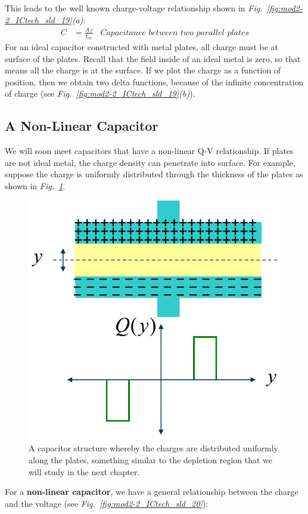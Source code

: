 This leads to the well known charge-voltage relationship shown in \emph{Fig.~\ref{fig:mod2-2_ICtech_sld_19}(a)}:
    \begin{align} 
        C &= \frac{A\,\varepsilon}{t_{ox}} &\textit{Capacitance between two parallel plates}
    \end{align}
For an ideal capacitor constructed with metal plates, all charge must be at surface of the plates.  Recall that the field inside of an ideal metal is zero, so that means all the charge is at the surface.  If we plot the charge as a function of position, then we obtain two delta functions, because of the infinite concentration of charge \big(see \emph{Fig.~\ref{fig:mod2-2_ICtech_sld_19}(b)}\big).
\subsection{A Non-Linear Capacitor}
We will soon meet capacitors that have a non-linear Q-V relationship.  If plates are not ideal metal, the charge density can penetrate into surface.  For example, suppose the charge is uniformly distributed through the thickness of the plates as shown in \emph{Fig.~\ref{fig:mod2-2_ICtech_sld_20b}}.
\begin{figure}[H]
\centering
\includegraphics[width=.5\columnwidth]{mod2-2_ICtech_sld_20b} 
\caption{A capacitor structure whereby the charges are distributed uniformly along the plates, something similar to the depletion region that we will study in the next chapter.}
\label{fig:mod2-2_ICtech_sld_20b}
\end{figure}
\newpage
For a \textbf{non-linear capacitor}, we have a general relationship between the charge and the voltage (see \emph{Fig.~\ref{fig:mod2-2_ICtech_sld_20}}):
